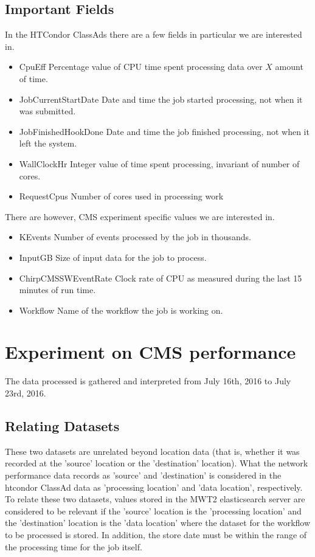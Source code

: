 \documentclass[sigconf]{acmart}
\begin{document}
\subsection{Important Fields}
In the HTCondor ClassAds there are a few fields in particular we are interested in.
\begin{itemize}
	\item CpuEff
	\subitem Percentage value of CPU time spent processing data over $X$ amount of time.
	\item JobCurrentStartDate
	\subitem Date and time the job started processing, not when it was submitted.
	\item JobFinishedHookDone
	\subitem Date and time the job finished processing, not when it left the system.
	\item WallClockHr
	\subitem Integer value of time spent processing, invariant of number of cores.
	\item RequestCpus
	\subitem Number of cores used in processing work
\end{itemize}
There are however, CMS experiment specific values we are interested in.
\begin{itemize}
    \item KEvents
    \subitem Number of events processed by the job in thousands.
	\item InputGB
	\subitem Size of input data for the job to process.
	\item ChirpCMSSWEventRate
	\subitem Clock rate of CPU as measured during the last 15 minutes of run time.
	\item Workflow
	\subitem Name of the workflow the job is working on.
\end{itemize}
\section{Experiment on CMS performance}
The data processed is gathered and interpreted from July 16th, 2016 to July 23rd, 2016.
\subsection{Relating Datasets}
These two datasets are unrelated beyond location data (that is, whether it was recorded at the 'source' location or the 'destination' location). What the network performance data records as 'source' and 'destination' is considered in the htcondor ClassAd data as 'processing location' and 'data location', respectively. To relate these two datasets, values stored in the MWT2 elasticsearch server are considered to be relevant if the 'source' location is the 'processing location' and the 'destination' location is the 'data location' where the dataset for the workflow to be processed is stored. In addition, the store date must be within the range of the processing time for the job itself. 
\end{document}
